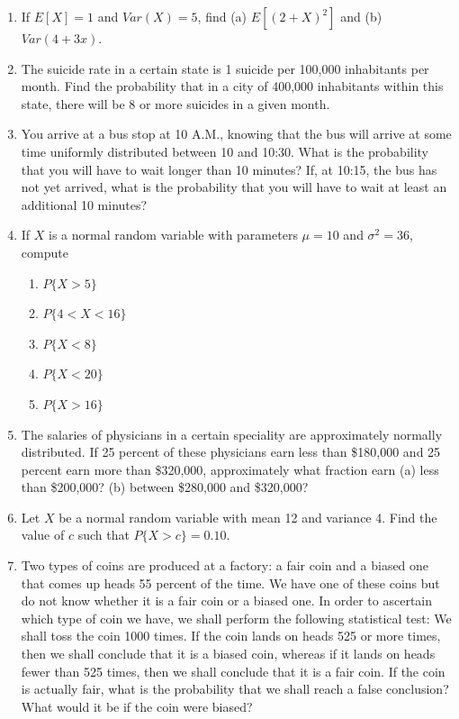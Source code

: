 \documentclass{article}
\begin{document}
\begin{enumerate}
    \item If $E[X] = 1$ and $Var(X) = 5$, find (a) $E[(2 + X)^2]$ and (b) $Var(4 + 3x)$.
    \item The suicide rate in a certain state is 1 suicide per 100,000 inhabitants per month. Find the probability that in a city of 400,000 inhabitants within this state, there will be 8 or more suicides in a given month.
    \item You arrive at a bus stop at 10 A.M., knowing that the bus will arrive at some time uniformly distributed between 10 and 10:30. What is the probability that you will have to wait longer than 10 minutes? If, at 10:15, the bus has not yet arrived, what is the probability that you will have to wait at least an additional 10 minutes?
    \item If $X$ is a normal random variable with parameters $\mu = 10$ and $\sigma^2 = 36$, compute
    \begin{enumerate}
        \item $P\{ X > 5 \}$
        \item $P\{ 4 < X < 16 \}$
        \item $P\{ X < 8 \}$
        \item $P\{ X < 20 \}$
        \item $P\{ X > 16 \}$
    \end{enumerate}
    \item The salaries of physicians in a certain speciality are approximately normally distributed. If 25 percent of these physicians earn less than \$180,000 and 25 percent earn more than \$320,000, approximately what fraction earn (a) less than \$200,000? (b) between \$280,000 and \$320,000?
    \item Let $X$ be a normal random variable with mean 12 and variance 4. Find the value of $c$ such that $P\{X > c\} = 0.10$.
    \item Two types of coins are produced at a factory: a fair coin and a biased one that comes up heads 55 percent of the time. We have one of these coins but do not know whether it is a fair coin or a biased one. In order to ascertain which type of coin we have, we shall perform the following statistical test: We shall toss the coin 1000 times. If the coin lands on heads 525 or more times, then we shall conclude that it is a biased coin, whereas if it lands on heads fewer than 525 times, then we shall conclude that it is a fair coin. If the coin is actually fair, what is the probability that we shall reach a false conclusion? What would it be if the coin were biased?

\end{enumerate}
\end{document}
